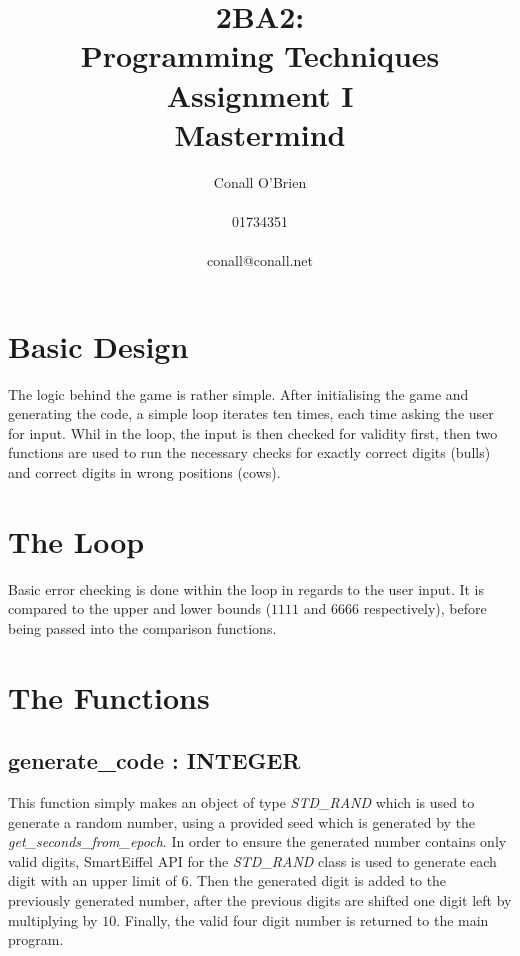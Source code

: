 \documentclass[a4paper,12pt]{article}
\begin{document}
\title{2BA2: \\ Programming Techniques \\ Assignment I \\ Mastermind}

\author{Conall O'Brien \\ \\ 01734351 \\ \\ conall@conall.net}

\maketitle

\pagebreak

\section{Basic Design}

The logic behind the game is rather simple. After initialising the game
and generating the code, a simple loop iterates ten times, each time
asking the user for input. Whil in the loop, the input is then checked
for validity first, then two functions are used to run the necessary
checks for exactly correct digits (bulls) and correct digits in wrong
positions (cows).

\section{The Loop}

Basic error checking is done within the loop in regards to the user
input. It is compared to the upper and lower bounds ($1111$ and $6666$
respectively), before being passed into the comparison functions.

\pagebreak

\section{The Functions}

\subsection{generate\_code : INTEGER}

This function simply makes an object of type \emph{STD\_RAND} which is
used to generate a random number, using a provided seed which is
generated by the \emph{get\_seconds\_from\_epoch}. In order to ensure
the generated number contains only valid digits, SmartEiffel API for the
\emph{STD\_RAND} class is used to generate each digit with an upper
limit of $6$. Then the generated digit is added to the previously
generated number, after the previous digits are shifted one digit left
by multiplying by $10$. Finally, the valid four digit number is returned
to the main program.
\end{document}
